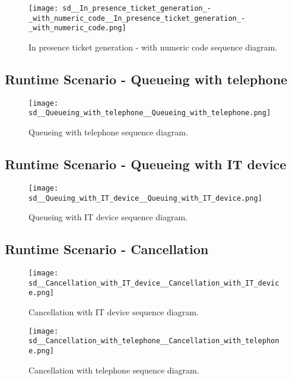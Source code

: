 \documentclass[../../main.tex]{subfiles}
\begin{document}
\begin{figure}[H]
    \centering
    \texttt{[image: sd\_\_In\_presence\_ticket\_generation\_-\_with\_numeric\_code\_\_In\_presence\_ticket\_generation\_-\_with\_numeric\_code.png]}
    \caption{
        In presence ticket generation - with numeric code sequence diagram.
    }
\end{figure}

\subsection{Runtime Scenario  - Queueing with telephone}

\begin{figure}[H]
    \centering
    \texttt{[image: sd\_\_Queueing\_with\_telephone\_\_Queueing\_with\_telephone.png]}
    \caption{
        Queueing with telephone sequence diagram.
    }
\end{figure}

\subsection{Runtime Scenario  - Queueing with IT device}

\begin{figure}[H]
    \centering
    \texttt{[image: sd\_\_Queuing\_with\_IT\_device\_\_Queuing\_with\_IT\_device.png]}
    \caption{
        Queueing with IT device sequence diagram.
    }
\end{figure}

\subsection{Runtime Scenario  - Cancellation}

\begin{figure}[H]
    \centering
    \texttt{[image: sd\_\_Cancellation\_with\_IT\_device\_\_Cancellation\_with\_IT\_device.png]}
    \caption{
        Cancellation with IT device sequence diagram.
    }
\end{figure}

\begin{figure}[H]
    \centering
    \texttt{[image: sd\_\_Cancellation\_with\_telephone\_\_Cancellation\_with\_telephone.png]}
    \caption{
        Cancellation with telephone sequence diagram.
    }
\end{figure}
\end{document}
